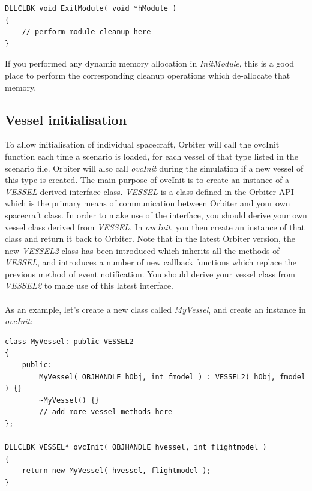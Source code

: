 \documentclass[Orbiter Developer Manual.tex]{subfiles}
\begin{document}
\begin{lstlisting}
DLLCLBK void ExitModule( void *hModule )
{
	// perform module cleanup here
}
\end{lstlisting}

\noindent
If you performed any dynamic memory allocation in \textit{InitModule}, this is a good place to perform the corresponding cleanup operations which de-allocate that memory.


\subsection{Vessel initialisation}
\label{ssec:vessel_init}
To allow initialisation of individual spacecraft, Orbiter will call the ovcInit function each time a scenario is loaded, for each vessel of that type listed in the scenario file. Orbiter will also call \textit{ovcInit} during the simulation if a new vessel of this type is created. The main purpose of ovcInit is to create an instance of a \textit{VESSEL}-derived interface class. \textit{VESSEL} is a class defined in the Orbiter API which is the primary means of communication between Orbiter and your own spacecraft class. In order to make use of the interface, you should derive your own vessel class derived from \textit{VESSEL}. In \textit{ovcInit}, you then create an instance of that class and return it back to Orbiter. Note that in the latest Orbiter version, the new \textit{VESSEL2} class has been introduced which inherits all the methods of \textit{VESSEL}, and introduces a number of new callback functions which replace the previous method of event notification. You should derive your vessel class from \textit{VESSEL2} to make use of this latest interface.\\
\\
As an example, let's create a new class called \textit{MyVessel}, and create an instance in \textit{ovcInit}:

\begin{lstlisting}
class MyVessel: public VESSEL2
{
	public:
		MyVessel( OBJHANDLE hObj, int fmodel ) : VESSEL2( hObj, fmodel ) {}
		~MyVessel() {}
		// add more vessel methods here
};

DLLCLBK VESSEL* ovcInit( OBJHANDLE hvessel, int flightmodel )
{
	return new MyVessel( hvessel, flightmodel );
}
\end{lstlisting}
\end{document}
